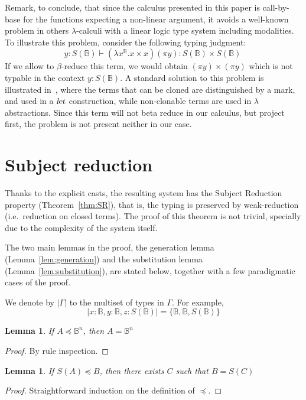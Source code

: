 \documentclass[preprint]{elsarticle}
\newtheorem{lemma}[theorem]{Lemma}
\newcommand\B{\ensuremath{\mathbb B}}
\begin{document}
Remark, to conclude, that since the calculus presented in this paper is
call-by-base for the functions expecting a non-linear argument, it avoids a
well-known problem in others $\lambda$-calculi with a linear logic type system
including modalities. To illustrate this problem, consider the following typing
judgment:
\[
  y:S(\B) \vdash (\lambda x^{\B}.x\times x) (\pi y):S(\B)\times S(\B) \
\]
If we allow to $\beta$-reduce this term, we would obtain $(\pi
y)\times(\pi y)$ which is not typable in the context $y:S(\B)$. A standard
solution to this problem is illustrated in~\cite{Barber96}, where the terms that
can be cloned are distinguished by a mark, and used in a $\textsl{let}$
construction, while non-clonable terms are used in $\lambda$ abstractions. Since
this term will not beta reduce in our calculus, but project first, the problem
is not present neither in our case.


\section{Subject reduction}\label{sec:SR}
Thanks to the explicit casts, the resulting system has the Subject Reduction
property (Theorem~\ref{thm:SR}), that is, the typing is preserved by
weak-reduction (i.e.~reduction on closed terms). The proof of this theorem is
not trivial, specially due to the complexity of the system itself.

The two main lemmas in the proof, the generation lemma (Lemma~\ref{lem:generation}) and the substitution
lemma (Lemma~\ref{lem:substitution}), are stated below, together with a few paradigmatic cases of the proof.

We denote by $|\Gamma|$ to the multiset of types in $\Gamma$. For example,
\[
  |x:\B,y:\B,z:S(\B)|=\{\B,\B,S(\B)\}
\]


\begin{lemma}
  \label{lem:lqBn}
  If $A\preceq\B^n$, then $A=\B^n$
\end{lemma}
\begin{proof}
  By rule inspection.
\end{proof}

\begin{lemma}\label{lem:noBasisPrec}
  If $S(A)\preceq B$, then there exists $C$ such that $B=S(C)$
\end{lemma}
\begin{proof}
  Straightforward induction on the definition of $\preceq$.
\end{proof}
\end{document}
